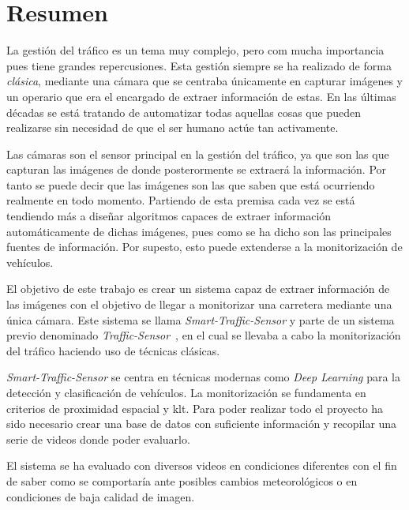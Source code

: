 \chapter*{Resumen}

La gestión del tráfico es un tema muy complejo, pero com mucha importancia pues tiene grandes repercusiones. Esta gestión siempre se ha realizado de forma \textit{clásica}, mediante una cámara que se centraba únicamente en capturar imágenes y un operario que era el encargado de extraer información de estas. En las últimas décadas se está tratando de automatizar todas aquellas cosas que pueden realizarse sin necesidad de que el ser humano actúe tan activamente.

Las cámaras son el sensor principal en la gestión del tráfico, ya que son las que capturan las imágenes de donde posterormente se extraerá la información. Por tanto se puede decir que las imágenes son las que saben que está ocurriendo realmente en todo momento. Partiendo de esta premisa cada  vez se está tendiendo más a diseñar algoritmos capaces de extraer información automáticamente de dichas imágenes, pues como se ha dicho son las principales fuentes de información. Por supesto, esto puede extenderse a la monitorización de vehículos.

El objetivo de este trabajo es crear un sistema capaz de extraer información de las imágenes con el objetivo de llegar a monitorizar una carretera mediante una única cámara. Este sistema se llama \textit{Smart-Traffic-Sensor} y parte de un sistema previo denominado \textit{Traffic-Sensor}~\cite{traffic_monitor_redo}, en el cual se llevaba a cabo la monitorización del tráfico haciendo uso de técnicas clásicas.

\textit{Smart-Traffic-Sensor} se centra en técnicas modernas como \textit{Deep Learning} para la detección y clasificación de vehículos. La monitorización se fundamenta en criterios  de  proximidad  espacial  y \acrfull{klt}. Para poder realizar todo el proyecto ha sido necesario crear una base de datos con suficiente información y recopilar una serie de videos donde poder evaluarlo.

El sistema se ha evaluado con diversos videos en condiciones diferentes con el fin de saber como se comportaría ante posibles cambios meteorológicos o en condiciones de baja calidad de imagen.




